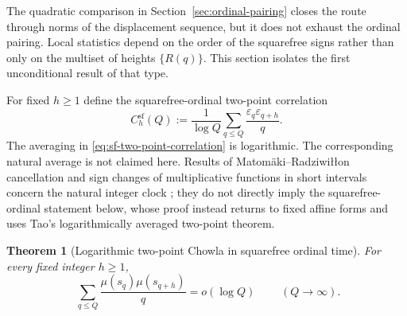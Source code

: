 \documentclass[11pt]{amsart}
\numberwithin{equation}{section}
\theoremstyle{plain}
\newtheorem{theorem}{Theorem}[section]
\theoremstyle{definition}
\theoremstyle{remark}
\begin{document}
The quadratic comparison in Section~\ref{sec:ordinal-pairing} closes the route
through norms of the displacement sequence, but it does not exhaust the ordinal
pairing.  Local statistics depend on the order of the squarefree signs rather
than only on the multiset of heights $\{R(q)\}$.  This section isolates the
first unconditional result of that type.

For fixed $h\ge1$ define the squarefree-ordinal two-point correlation
\begin{equation}
\label{eq:sf-two-point-correlation}
C_h^{\mathrm{sf}}(Q)
:=\frac{1}{\log Q}\sum_{q\le Q}
\frac{\varepsilon_q\varepsilon_{q+h}}{q}.
\end{equation}
The averaging in \eqref{eq:sf-two-point-correlation} is logarithmic.  The
corresponding natural average is not claimed here.  Results of
Matom\"aki--Radziwi\l\l on cancellation and sign changes of multiplicative
functions in short intervals concern the natural integer clock
\cite{MatomakiRadziwill2016}; they do not directly imply the squarefree-ordinal
statement below, whose proof instead returns to fixed affine forms and uses
Tao's logarithmically averaged two-point theorem.

\begin{theorem}[Logarithmic two-point Chowla in squarefree ordinal time]
\label{thm:sf-log-chowla-two}
For every fixed integer $h\ge1$,
\begin{equation}
\label{eq:sf-log-chowla-two}
\boxed{\;
\sum_{q\le Q}\frac{\mu(s_q)\mu(s_{q+h})}{q}=o(\log Q)
\;}
\qquad(Q\to\infty).
\end{equation}
\end{theorem}
\end{document}
